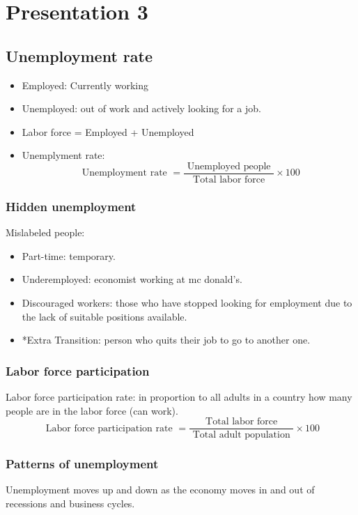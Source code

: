 \documentclass[openany]{book}
\begin{document}
\chapter{Presentation 3}
\section{Unemployment rate}
\begin{itemize}
    \item Employed: Currently working 
    \item Unemployed: out of work and actively looking for a job.
    \item Labor force = Employed + Unemployed 
    \item Unemplyment rate: 
        \[
          \text{ Unemployment rate } = \frac{\text{ Unemployed people }}{\text{ Total labor force }} \times 100 
        \]
\end{itemize}

\subsection{Hidden unemployment}
Mislabeled people: 
\begin{itemize}
    \item Part-time: temporary.
    \item Underemployed: economist working at mc donald's.
    \item Discouraged workers: those who have stopped looking for employment due to the lack of suitable positions available.
    \item *Extra Transition: person who quits their job to go to another one. 
\end{itemize}

\subsection{Labor force participation}
Labor force participation rate: in proportion to all adults in a country how many people are in the labor force (can work). 
\[
  \text{ Labor force participation rate } = \frac{\text{ Total labor force }}{\text{ Total adult population }} \times 100
\]

\subsection{Patterns of unemployment}
Unemployment moves up and down as the economy moves in and out of recessions and business cycles.
\end{document}
